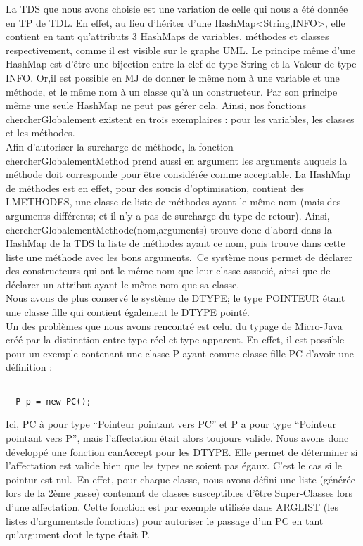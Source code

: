 
La TDS que nous avons choisie est une variation de celle qui nous a été donnée
en TP de TDL. En effet, au lieu d'hériter d'une HashMap<String,INFO>, elle
contient en tant qu'attributs 3 HashMaps de variables, méthodes et classes
respectivement, comme il est visible sur le graphe UML. Le principe même d'une
HashMap est d'être une bijection entre la clef de type String et la Valeur de
type INFO. Or,il est possible en MJ de donner le même nom à une variable et une
méthode, et le même nom à un classe qu'à un constructeur. Par son principe même
une seule HashMap ne peut pas gérer cela. Ainsi, nos fonctions
chercherGlobalement existent en trois exemplaires : pour les variables, les
classes et les méthodes.\\

Afin d'autoriser la surcharge de méthode, la fonction chercherGlobalementMethod
prend aussi en argument les arguments auquels la méthode doit corresponde pour être
considérée comme acceptable. La HashMap de méthodes est en effet, pour des soucis
d'optimisation, contient des LMETHODES, une classe de liste de méthodes ayant le
même nom (mais des arguments différents; et il n'y a pas de surcharge du type de
retour). Ainsi, chercherGlobalementMethode(nom,arguments) trouve donc d'abord
dans la HashMap de la TDS la liste de méthodes ayant ce nom, puis trouve dans
cette liste une méthode avec les bons arguments.\
Ce système nous permet de déclarer des constructeurs qui ont le même nom que
leur classe associé, ainsi que de déclarer un attribut ayant le même nom que sa
classe.\\

Nous avons de plus conservé le système de DTYPE; le type POINTEUR étant une
classe fille qui contient également le DTYPE pointé.\\

Un des problèmes que nous avons rencontré est celui du typage de Micro-Java créé
par la distinction entre type réel et type apparent. En effet, il est possible
pour un exemple contenant une classe P ayant comme classe fille PC d'avoir une
définition :

\begin{verbatim}
 
  P p = new PC();

\end{verbatim}

Ici, PC à pour type ``Pointeur pointant vers PC'' et P a pour type ``Pointeur
pointant vers P'', mais l'affectation était alors toujours valide. Nous avons
donc développé une fonction canAccept pour les DTYPE. Elle permet de déterminer
si l'affectation est valide bien que les types ne soient pas égaux. C'est le cas
si le pointur est nul.\
En effet, pour chaque classe, nous avons défini une liste (générée lors de la
2ème passe) contenant de classes susceptibles d'être Super-Classes lors d'une
affectation. Cette fonction est par exemple utilisée dans ARGLIST (les listes
d'argumentsde fonctions) pour autoriser le passage d'un PC en tant qu'argument
dont le type était P.\\

